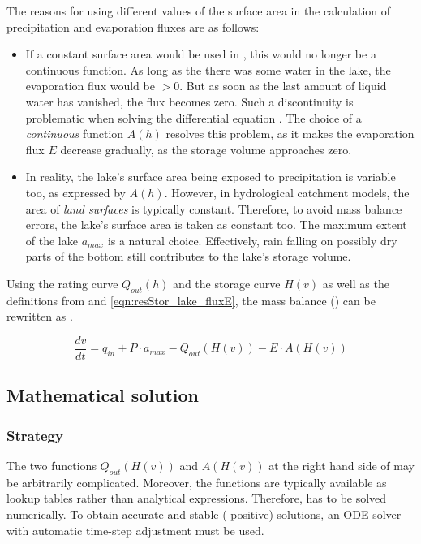 \medskip
The reasons for using different values of the surface area in the calculation of precipitation and evaporation fluxes are as follows:
\begin{itemize}
  \item If a constant surface area would be used in , this would no longer be a continuous function. As long as the there was some water in the lake, the evaporation flux would be $>0$. But as soon as the last amount of liquid water has vanished, the flux becomes zero. Such a discontinuity is problematic when solving the differential equation . The choice of a \emph{continuous} function $A(h)$ resolves this problem, as it makes the evaporation flux $E$ decrease gradually, as the storage volume approaches zero.
  \item In reality, the lake's surface area being exposed to precipitation is variable too, as expressed by $A(h)$. However, in hydrological catchment models, the area of \emph{land surfaces} is typically constant. Therefore, to avoid mass balance errors, the lake's surface area is taken as constant too. The maximum extent of the lake $a_{max}$ is a natural choice. Effectively, rain falling on possibly dry parts of the bottom still contributes to the lake's storage volume.
\end{itemize}

Using the rating curve $Q_{out}(h)$ and the storage curve $H(v)$ as well as the definitions from  and \ref{eqn:resStor_lake_fluxE}, the mass balance () can be rewritten as .

\begin{equation} \label{eqn:resStor_lake_massBalanceExt}
  \frac{dv}{dt} = q_{in} + P \cdot a_{max} - Q_{out}(H(v)) - E \cdot A(H(v))
\end{equation}


\subsection{Mathematical solution} \label{sec:resStor_lake_solution}

\subsubsection*{Strategy}
The two functions $Q_{out}(H(v))$ and $A(H(v))$ at the right hand side of  may be arbitrarily complicated. Moreover, the functions are typically available as lookup tables rather than analytical expressions. Therefore,  has to be solved numerically. To obtain accurate and stable (\ie{} positive) solutions, an ODE solver with automatic time-step adjustment must be used.


